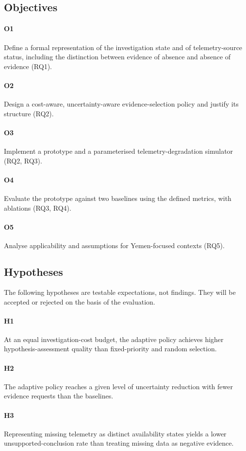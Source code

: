\documentclass[a4paper,11pt,oneside]{article}
\begin{document}
\subsection{Objectives}
\paragraph{O1} Define a formal representation of the investigation state and of telemetry-source
status, including the distinction between evidence of absence and absence of evidence (RQ1).
\paragraph{O2} Design a cost-aware, uncertainty-aware evidence-selection policy and justify its
structure (RQ2).
\paragraph{O3} Implement a prototype and a parameterised telemetry-degradation simulator (RQ2,
RQ3).
\paragraph{O4} Evaluate the prototype against two baselines using the defined metrics, with ablations (RQ3, RQ4).
\paragraph{O5} Analyse applicability and assumptions for Yemen-focused contexts (RQ5).
\subsection{Hypotheses}
The following hypotheses are testable expectations, not findings. They will be accepted or rejected on the basis of the evaluation.
\paragraph{H1} At an equal investigation-cost budget, the adaptive policy achieves higher hypothesis-assessment quality than fixed-priority and random selection.
\paragraph{H2} The adaptive policy reaches a given level of uncertainty reduction with fewer
evidence requests than the baselines.
\paragraph{H3} Representing missing telemetry as distinct availability states yields a lower
unsupported-conclusion rate than treating missing data as negative evidence.
\end{document}
